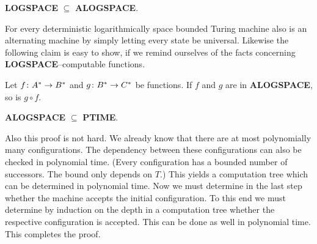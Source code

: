 \begin{lem}
\label{lem:enth}
\textbf{LOGSPACE} $\subseteq$ \textbf{ALOGSPACE}.
\end{lem}
For every deterministic logarithmically space bounded
Turing machine also is an alternating machine
by simply letting every state be universal. Likewise the
following claim is easy to show, if we remind ourselves of
the facts concerning \textbf{LOGSPACE}--computable functions.
\begin{lem}
\label{lem:verkn}
Let $f \colon A^{\ast} \rightarrow B^{\ast}$ and $g\colon B^{\ast} \rightarrow C^{\ast}$ 
be functions. If $f$ and $g$ are in \textbf{ALOG\-SPACE}, so is 
$g \circ f$.
\end{lem}
\begin{lem}
\textbf{ALOGSPACE} $\subseteq$ \textbf{PTIME}.
\end{lem}
Also this proof is not hard. We already know that there are
at most polynomially many configurations. The dependency
between these configurations can also be checked in polynomial
time. (Every configuration has a bounded number of successors.
The bound only depends on $T$.) This yields a computation
tree which can be determined in polynomial time. Now we must
determine in the last step whether the machine accepts the
initial configuration. To this end we must determine by induction
on the depth in a computation tree whether the respective
configuration is accepted. This can be done as well in
polynomial time. This completes the proof.

